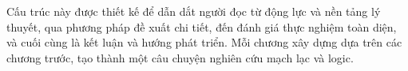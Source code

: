 \vspace{1em}

Cấu trúc này được thiết kế để dẫn dắt người đọc từ động lực và nền tảng lý thuyết, qua phương pháp đề xuất chi tiết, đến đánh giá thực nghiệm toàn diện, và cuối cùng là kết luận và hướng phát triển. Mỗi chương xây dựng dựa trên các chương trước, tạo thành một câu chuyện nghiên cứu mạch lạc và logic.
